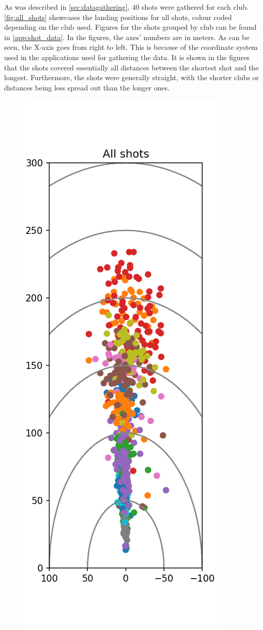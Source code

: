 \documentclass{kththesis}
\begin{document}
As was described in \autoref{sec:datagathering}, 40 shots were gathered for each club. \autoref{fig:all_shots} showcases the landing positions for all shots, colour coded depending on the club used. Figures for the shots grouped by club can be found in \autoref{app:shot_data}. In the figures, the axes' numbers are in meters. As can be seen, the X-axis goes from right to left. This is because of the coordinate system used in the applications used for gathering the data. It is shown in the figures that the shots covered essentially all distances between the shortest shot and the longest. Furthermore, the shots were generally straight, with the shorter clubs or distances being less spread out than the longer ones.

\begin{figure}
    \centering
    \includegraphics[height=0.4\textheight]{Shots/all_shots.png}

\end{figure}
\end{document}
